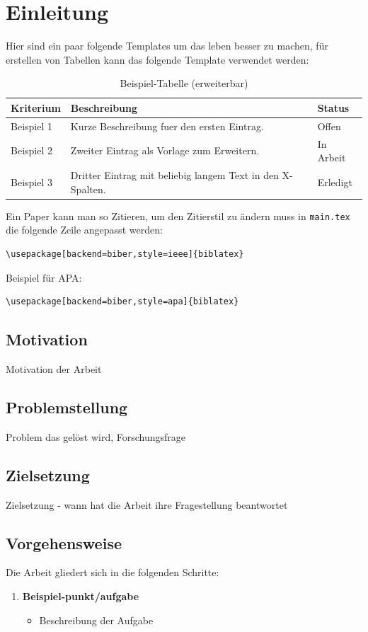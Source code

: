 \section{Einleitung}

Hier sind ein paar folgende Templates um das leben besser zu machen, für erstellen von Tabellen kann das folgende Template verwendet werden: 
\begin{table}[H]
  \centering
  \caption{Beispiel-Tabelle (erweiterbar)}
  \label{tab:einleitung-template}
  \begin{tabularx}{\textwidth}{@{}l X X@{}}
    \toprule
    Kriterium & Beschreibung & Status \\
    \midrule
    Beispiel 1 & Kurze Beschreibung fuer den ersten Eintrag. & Offen \\
    Beispiel 2 & Zweiter Eintrag als Vorlage zum Erweitern. & In Arbeit \\
    Beispiel 3 & Dritter Eintrag mit beliebig langem Text in den X-Spalten. & Erledigt \\
    \bottomrule
  \end{tabularx}
\end{table}

Ein Paper kann man so Zitieren\parencite{einstein1905electrodynamics}, um den Zitierstil zu ändern muss in \texttt{main.tex} die folgende Zeile angepasst werden:
\begin{verbatim}
\usepackage[backend=biber,style=ieee]{biblatex}
\end{verbatim}
Beispiel für APA:
\begin{verbatim}
\usepackage[backend=biber,style=apa]{biblatex}
\end{verbatim}

\subsection{Motivation}
Motivation der Arbeit 

\subsection{Problemstellung}
Problem das gelöst wird, Forschungsfrage 

\subsection{Zielsetzung}
Zielsetzung - wann hat die Arbeit ihre Fragestellung beantwortet

\subsection{Vorgehensweise}
Die Arbeit gliedert sich in die folgenden Schritte:
\begin{enumerate}
  \item \textbf{Beispiel-punkt/aufgabe}
    \begin{itemize}
      \item Beschreibung der Aufgabe
    \end{itemize}
\end{enumerate}
